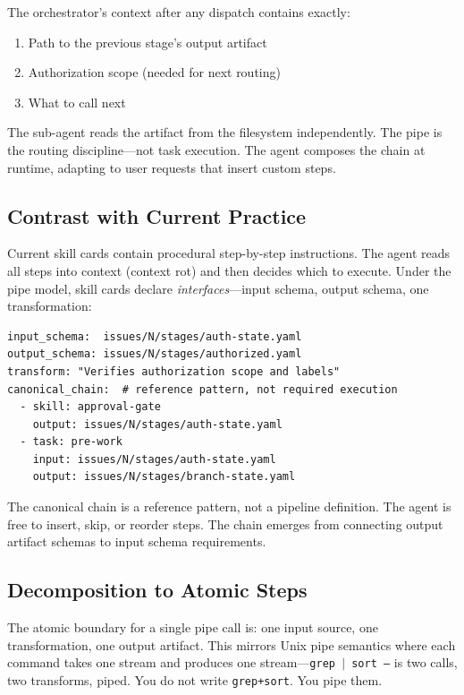 \documentclass[11pt,a4paper]{article}
\begin{document}
The orchestrator's context after any dispatch contains exactly:
\begin{enumerate}[nosep]
  \item Path to the previous stage's output artifact
  \item Authorization scope (needed for next routing)
  \item What to call next
\end{enumerate}

The sub-agent reads the artifact from the filesystem independently. The pipe is the routing discipline---not task execution. The agent composes the chain at runtime, adapting to user requests that insert custom steps.

\subsection{Contrast with Current Practice}
Current skill cards contain procedural step-by-step instructions. The agent reads all steps into context (context rot) and then decides which to execute. Under the pipe model, skill cards declare \emph{interfaces}---input schema, output schema, one transformation:

\begin{lstlisting}[style=yaml,caption={Pipe model skill card frontmatter.},label=lst:card]
input_schema:  issues/N/stages/auth-state.yaml
output_schema: issues/N/stages/authorized.yaml
transform: "Verifies authorization scope and labels"
canonical_chain:  # reference pattern, not required execution
  - skill: approval-gate
    output: issues/N/stages/auth-state.yaml
  - task: pre-work
    input: issues/N/stages/auth-state.yaml
    output: issues/N/stages/branch-state.yaml
\end{lstlisting}

The canonical chain is a reference pattern, not a pipeline definition. The agent is free to insert, skip, or reorder steps. The chain emerges from connecting output artifact schemas to input schema requirements.

\subsection{Decomposition to Atomic Steps}
The atomic boundary for a single pipe call is: one input source, one transformation, one output artifact. This mirrors Unix pipe semantics where each command takes one stream and produces one stream---\texttt{grep $\vert$ sort ---} is two calls, two transforms, piped. You do not write \texttt{grep+sort}. You pipe them.
\end{document}
